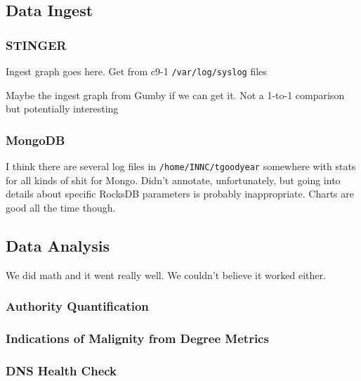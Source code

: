 \documentclass{acm_proc_article-sp}
\begin{document}
\subsection{Data Ingest}

\subsubsection{STINGER}
Ingest graph goes here. Get from c9-1 \texttt{/var/log/syslog} files

Maybe the ingest graph from Gumby if we can get it. Not a 1-to-1 comparison but potentially interesting

\subsubsection{MongoDB}
I think there are several log files in \texttt{/home/INNC/tgoodyear} somewhere with stats for all kinds of shit for Mongo. Didn't annotate, unfortunately, but going into details about specific RocksDB parameters is probably inappropriate. Charts are good all the time though.


\subsection{Data Analysis}
We did math and it went really well. We couldn't believe it worked either.

\subsubsection{Authority Quantification}

\subsubsection{Indications of Malignity from Degree Metrics}

\subsubsection{DNS Health Check}




\end{document}
